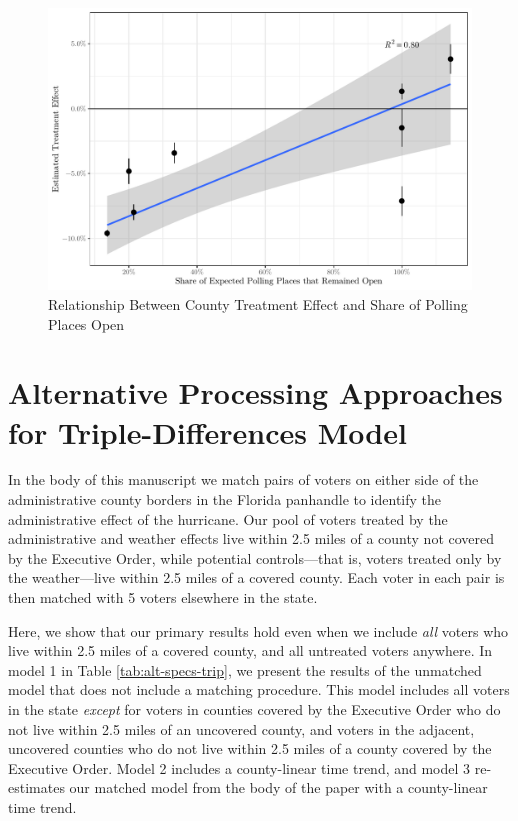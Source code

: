 \documentclass[
  12pt,
]{article}
\begin{document}
\begin{figure}[H]

{\centering \includegraphics{si_files/figure-latex/inter-chunk-1} 

}

\caption{\label{fig:inter-counties}Relationship Between County Treatment Effect and Share of Polling Places Open}\label{fig:inter-chunk}
\end{figure}

\hypertarget{alternative-processing-approaches-for-triple-differences-model}{%
\section*{Alternative Processing Approaches for Triple-Differences Model}\label{alternative-processing-approaches-for-triple-differences-model}}

In the body of this manuscript we match pairs of voters on either side of the administrative county borders in the Florida panhandle to identify the administrative effect of the hurricane. Our pool of voters treated by the administrative and weather effects live within 2.5 miles of a county not covered by the Executive Order, while potential controls---that is, voters treated only by the weather---live within 2.5 miles of a covered county. Each voter in each pair is then matched with 5 voters elsewhere in the state.

Here, we show that our primary results hold even when we include \emph{all} voters who live within 2.5 miles of a covered county, and all untreated voters anywhere. In model 1 in Table \ref{tab:alt-specs-trip}, we present the results of the unmatched model that does not include a matching procedure. This model includes all voters in the state \emph{except} for voters in counties covered by the Executive Order who do not live within 2.5 miles of an uncovered county, and voters in the adjacent, uncovered counties who do not live within 2.5 miles of a county covered by the Executive Order. Model 2 includes a county-linear time trend, and model 3 re-estimates our matched model from the body of the paper with a county-linear time trend.
\end{document}
